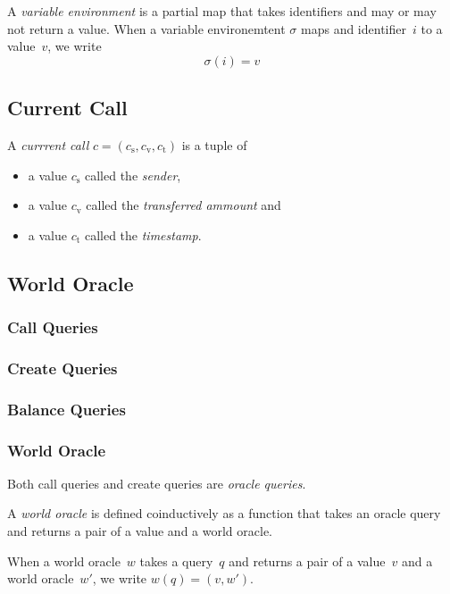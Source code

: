 \documentclass{book}
\begin{document}
A \textit{variable environment} is a partial map that takes identifiers and may or may not return a value.  When a variable environemtent $\sigma$ maps and identifier~$i$ to a value~$v$, we write
\[
\sigma(i) = v
\]

\subsection{Current Call}

A \textit{currrent call} $c = (c_\mathrm{s}, c_\mathrm{v}, c_\mathrm{t})$ is a tuple of
\begin{itemize}
\item a value $c_\mathrm{s}$ called the \textit{sender},
\item a value $c_\mathrm{v}$ called the \textit{transferred ammount} and
\item a value $c_\mathrm{t}$ called the \textit{timestamp}.
\end{itemize}

\subsection{World Oracle}

\subsubsection{Call Queries}

\subsubsection{Create Queries}

\subsubsection{Balance Queries}

\subsubsection{World Oracle}

Both call queries and create queries are \textit{oracle queries}.

A \textit{world oracle} is defined coinductively as a function that takes an oracle query and returns a pair of a value and a world oracle.

When a world oracle~$w$ takes a query~$q$ and returns a pair of a value~$v$ and a world oracle~$w'$, we write $w(q) = (v, w')$.
\end{document}
